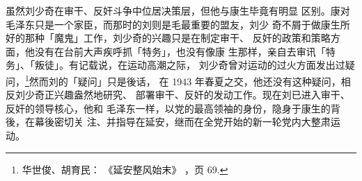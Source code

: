 虽然刘少奇在审干、反奸斗争中位居决策层，但他与康生毕竟有明显
区别。康对毛泽东只是一个家臣，而那时的刘则是毛最重要的盟友，刘少
奇不屑于做康生所好的那种「魔鬼」工作，刘少奇的兴趣只是在制定审干、
反奸的政策和策略方面，他没有在台前大声疾呼抓「特务」，也没有像康
生那样，亲自去审讯「特务」、「叛徒」。有记载说，在运动高潮之际，
刘少奇曾对运动的过火方面发出过疑问，\footnote{华世俊、胡育民：
《延安整风始末》
，页 69.}然而刘的「疑问」只是後话，
在 1943 年春夏之交，他还没有这种疑问，相反刘少奇正兴趣盎然地研究、
部署审干、反奸的发动工作。现在刘已进入审干、反奸的领导核心，他和
毛泽东一样，以党的最高领袖的身份，隐身于康生的背後，在幕後密切关
注、并指导在延安，继而在全党开始的新一轮党内大整肃运动。
 
